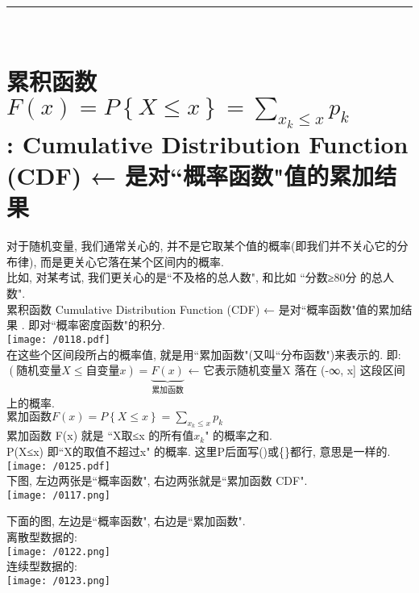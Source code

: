 \documentclass[UTF8]{ctexart}
\begin{document}
~\\
\hrule
~\\

\part{累积函数 $F\left( x \right) =P\left\{ X\leq x \right\} =\sum_{x_k\leq x}^{}{p_k}$  \\ : Cumulative Distribution Function (CDF)  ← 是对``概率函数"值的累加结果}


对于随机变量, 我们通常关心的, 并不是它取某个值的概率(即我们并不关心它的分布律), 而是更关心它落在某个区间内的概率.  \\
比如, 对某考试, 我们更关心的是``不及格的总人数", 和比如 ``分数≥80分 的总人数". \\


累积函数 Cumulative Distribution Function (CDF) ← 是对``概率函数"值的累加结果 . 即对``概率密度函数"的积分.  \\

\texttt{[image: /0118.pdf]} \\


 在这些个区间段所占的概率值, 就是用``累加函数"(又叫``分布函数")来表示的. 即: \\
 $ (\text{随机变量}X\leq \text{自变量}x)=\underset{\text{累加函数}}{\underbrace{F(x)}}
$ ← 它表示随机变量X 落在 (-∞, x] 这段区间上的概率. \\

$\boxed{
	\text{累加函数} F\left( x \right) =P\left\{ X\leq x \right\} =\sum_{x_k\leq x}^{}{p_k}
}$ \\

累加函数 F(x) 就是 ``X取≤x 的所有值$x_k$" 的概率之和. \\
P(X≤x) 即``X的取值不超过x" 的概率. 这里P后面写()或\{\}都行, 意思是一样的. \\


\texttt{[image: /0125.pdf]} \\




下图, 左边两张是``概率函数", 右边两张就是``累加函数 CDF". \\

\texttt{[image: /0117.png]} \\





\begin{myEnvSample}
下面的图, 左边是``概率函数", 右边是``累加函数". \\

离散型数据的: \\
\texttt{[image: /0122.png]} \\

连续型数据的: \\
\texttt{[image: /0123.png]} 
\end{myEnvSample} 
\end{document}
